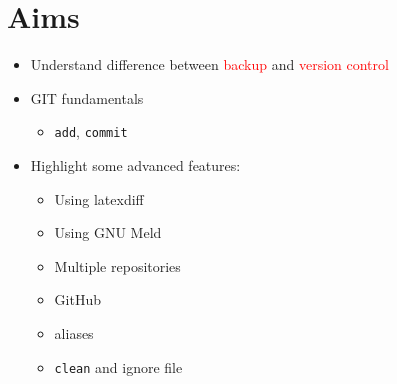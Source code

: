 \documentclass[a4paper,12pt]{article}
\newcommand{\ALERT}[1]{\textcolor{red}{#1}}
\newcommand{\CMD}[1]{\texttt{#1}}
\begin{document}
\section{Aims}
\label{sec:aims}

\begin{itemize}
\item Understand difference between \ALERT{backup} and \ALERT{version
    control}
\item GIT fundamentals
  \begin{itemize}
  \item \CMD{add}, \CMD{commit}
  \end{itemize}
\item Highlight some advanced features:
  \begin{itemize}
  \item Using latexdiff
  \item Using GNU Meld
  \item Multiple repositories
  \item GitHub
  \item aliases
  \item \CMD{clean} and ignore file
  \end{itemize}
\end{itemize}
\end{document}
